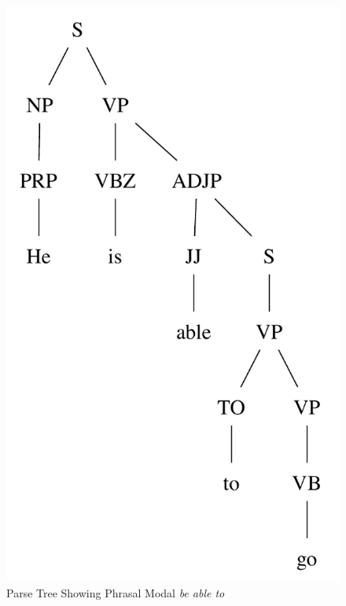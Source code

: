 \documentclass[main.tex]{subfiles}
\begin{document}
\begin{figure}[htb]
\centering
\includegraphics[scale=0.53]{modal-able.pdf}
\caption{Parse Tree Showing Phrasal Modal \textit{be able to}}
\label{fig:quasimodal-able}
\end{figure}
\end{document}
